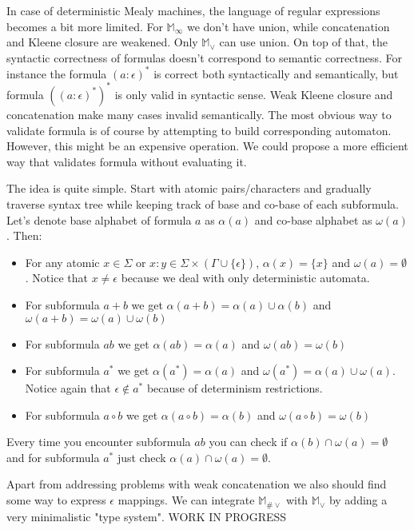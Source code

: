 \documentclass[12pt]{article}
\begin{document}
In case of deterministic Mealy machines, the language of regular expressions becomes a bit more limited. For $\mathbb{M}_\infty$ we don't have union, while  concatenation and Kleene closure are weakened. Only $\mathbb{M}_\vee$ can use union. On top of that, the syntactic correctness of formulas doesn't correspond to semantic correctness. For instance the formula $(a:\epsilon)^*$ is correct both syntactically and semantically, but formula $((a:\epsilon)^*)^*$ is only valid in syntactic sense. Weak Kleene closure and concatenation make many cases invalid semantically. The most obvious way to validate formula is of course by attempting to build corresponding automaton. However, this might be an expensive operation. We could propose a more efficient way that validates formula without evaluating it.

The idea is quite simple. Start with atomic pairs/characters and gradually traverse syntax tree while keeping track of base and co-base of each subformula. Let's denote base alphabet of formula $a$ as $\alpha(a)$ and co-base alphabet as $\omega(a)$. Then:
\begin{itemize}
	\item For any atomic $x\in\Sigma$ or $x:y\in\Sigma\times(\Gamma\cup\{\epsilon\})$, $\alpha(x) = \{x\}$ and $ \omega(a) = \emptyset$. Notice that $x\ne\epsilon$ because we deal with only deterministic automata.
	\item For subformula $a+b$ we get $\alpha(a+b) = \alpha(a) \cup \alpha(b) $ and $\omega(a+b) = \omega(a) \cup \omega(b) $
	\item For subformula $ab$ we get $\alpha(ab) = \alpha(a) $ and $\omega(ab) = \omega(b) $
	\item For subformula $a^*$ we get $\alpha(a^*) = \alpha(a)$ and $\omega(a^*) =   \alpha(a) \cup \omega(a) $. Notice again that $\epsilon \notin a^*$ because of determinism restrictions.
	\item For subformula $a\circ b$ we get $\alpha(a\circ b) = \alpha(b) $ and $\omega(a\circ b) = \omega(b) $
\end{itemize}
Every time you encounter subformula $ab$ you can check if $\alpha(b)\cap\omega(a)=\emptyset$ and for subformula $a^*$ just check $\alpha(a)\cap\omega(a)=\emptyset$. 

Apart from addressing problems with weak concatenation we also should find some way to express $\epsilon$ mappings. We can integrate $\mathbb{ M}_{\#\vee}$  with $\mathbb{ M}_\vee$ by adding a very minimalistic "type system". WORK IN PROGRESS
\end{document}
